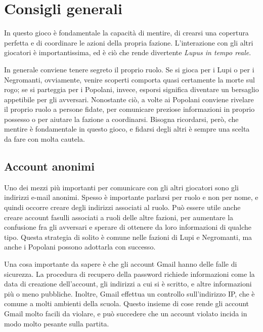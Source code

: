 \documentclass[a4paper,10pt]{article}
\begin{document}
\section{Consigli generali}

In questo gioco è fondamentale la capacità di mentire, di crearsi una copertura perfetta e di coordinare le azioni della propria fazione. L'interazione con gli altri giocatori è importantissima, ed è ciò che rende divertente \emph{Lupus in tempo reale}.

In generale conviene tenere segreto il proprio ruolo. Se si gioca per i Lupi o per i Negromanti, ovviamente, venire scoperti comporta quasi certamente la morte sul rogo; se si parteggia per i Popolani, invece, esporsi significa diventare un bersaglio appetibile per gli avversari. Nonostante ciò, a volte ai Popolani conviene rivelare il proprio ruolo a persone fidate, per comunicare preziose informazioni in proprio possesso o per aiutare la fazione a coordinarsi. Bisogna ricordarsi, però, che mentire è fondamentale in questo gioco, e fidarsi degli altri è sempre una scelta da fare con molta cautela.

\subsection{Account anonimi}

Uno dei mezzi più importanti per comunicare con gli altri giocatori sono gli indirizzi e-mail anonimi. Spesso è importante parlarsi per ruolo e non per nome, e quindi occorre creare degli indirizzi associati al ruolo. Può essere utile anche creare account fasulli associati a ruoli delle altre fazioni, per aumentare la confusione fra gli avversari e sperare di ottenere da loro informazioni di qualche tipo. Questa strategia di solito è comune nelle fazioni di Lupi e Negromanti, ma anche i Popolani possono adottarla con successo.

Una cosa importante da sapere è che gli account Gmail hanno delle falle di sicurezza. La procedura di recupero della password richiede informazioni come la data di creazione dell'account, gli indirizzi a cui si è scritto, e altre informazioni più o meno pubbliche. Inoltre, Gmail effettua un controllo sull'indirizzo IP, che è comune a molti ambienti della scuola. Questo insieme di cose rende gli account Gmail molto facili da violare, e può succedere che un account violato incida in modo molto pesante sulla partita.
\end{document}
